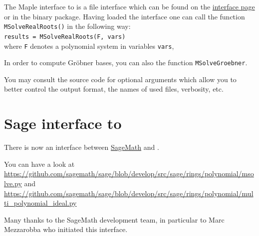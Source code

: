 \documentclass[a4paper,english,11pt]{scrartcl}
\theoremstyle{definition}
\theoremstyle{remark}
\begin{document}
The Maple interface to \msolve is a file interface which can be found on the
\msolve \href{https://msolve.lip6.fr/interfaces/index.html}{interface
  page} or in the \msolve binary package. Having loaded the interface
one can call the function
\texttt{MSolveRealRoots()} in the following way:\\[1em]
\texttt{results = MSolveRealRoots(F, vars)}\\[1em]
where \texttt{F} denotes a polynomial system in variables \texttt{vars},


In order to compute Gr\"obner bases, you can also the function
\texttt{MSolveGroebner}.

You may consult the source code for optional arguments which allow you to better
control the output format, the names of used files, verbosity, etc.

\section{Sage interface to \msolve}

There is now an interface between \href{https://www.sagemath.org/}{SageMath}
and \msolve.

You can have a look at
\url{https://github.com/sagemath/sage/blob/develop/src/sage/rings/polynomial/msolve.py}
and
\url{https://github.com/sagemath/sage/blob/develop/src/sage/rings/polynomial/multi_polynomial_ideal.py}

\hfill Many thanks to the SageMath development team, in particular to Marc
Mezzarobba who initiated this interface.

\end{document}
